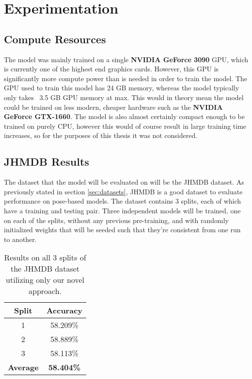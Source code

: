 
\chapter{Experimentation} %

\label{Experimentation} %

\section{Compute Resources}

The model was mainly trained on a single \textbf{NVIDIA GeForce 3090} GPU, which is currently one of the highest end graphics cards. However, this GPU is significantly more compute power than is needed in order to train the model. The GPU used to train this model has 24 GB memory, whereas the model typically only takes ~3.5 GB GPU memory at max. This would in theory mean the model could be trained on less modern, cheaper hardware such as the \textbf{NVIDIA GeForce GTX-1660}. The model is also almost certainly compact enough to be trained on purely CPU, however this would of course result in large training time increases, so for the purposes of this thesis it was not considered.

\section{JHMDB Results}
\label{sec:JHMDBResults}

The dataset that the model will be evaluated on will be the JHMDB dataset. As previously stated in section \ref{sec:datasets}, JHMDB is a good dataset to evaluate performance on pose-based models. The dataset contains 3 splits, each of which have a training and testing pair. Three independent models will be trained, one on each of the splits, without any previous pre-training, and with randomly initialized weights that will be seeded such that they're consistent from one run to another.

\begin{table}[ht]
	\centering
	\begin{tabular}{||c c||} 
		\hline
		\textbf{Split} & \textbf{Accuracy} \\ [0.5ex] 
		\hline\hline
		1 & 58.209\% \\ 
		\hline
		2 & 58.889\% \\
		\hline
		3 & 58.113\% \\
		\hline
		\hline
		\textbf{Average} & \textbf{58.404\%} \\
		\hline
	\end{tabular}
	\caption{Results on all 3 splits of the JHMDB dataset utilizing only our novel approach.}
	\label{tab:acc-results}
\end{table}

